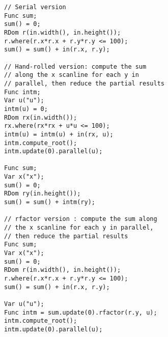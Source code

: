 \begin{lstlisting}[caption={Summation over a circular reduction domain with radius of 10: serial vs. parallel hand-rolled vs. parallel rfactor}, label={lst:circular_sum}]
// Serial version
Func sum;
sum() = 0;
RDom r(in.width(), in.height());
r.where(r.x*r.x + r.y*r.y <= 100);
sum() = sum() + in(r.x, r.y);

// Hand-rolled version: compute the sum 
// along the x scanline for each y in 
// parallel, then reduce the partial results
Func intm;
Var u("u");
intm(u) = 0;
RDom rx(in.width());
rx.where(rx*rx + u*u <= 100);
intm(u) = intm(u) + in(rx, u);
intm.compute_root();
intm.update(0).parallel(u);

Func sum;
Var x("x");
sum() = 0;
RDom ry(in.height());
sum() = sum() + intm(ry);

// rfactor version : compute the sum along
// the x scanline for each y in parallel, 
// then reduce the partial results
Func sum;
Var x("x");
sum() = 0;
RDom r(in.width(), in.height());
r.where(r.x*r.x + r.y*r.y <= 100);
sum() = sum() + in(r.x, r.y);

Var u("u");
Func intm = sum.update(0).rfactor(r.y, u);
intm.compute_root();
intm.update(0).parallel(u);
\end{lstlisting}
